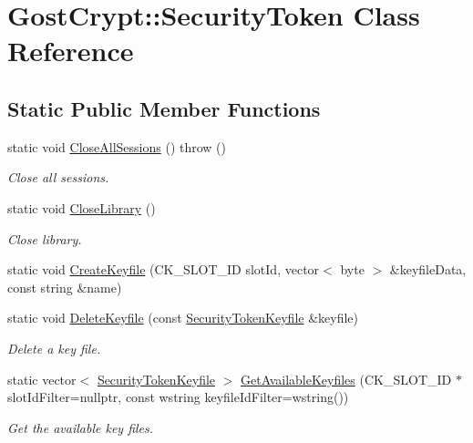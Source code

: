 \hypertarget{class_gost_crypt_1_1_security_token}{}\section{Gost\+Crypt\+:\+:Security\+Token Class Reference}
\label{class_gost_crypt_1_1_security_token}
\subsection*{Static Public Member Functions}
\begin{DoxyCompactItemize}
\item 
static void \hyperlink{class_gost_crypt_1_1_security_token_af12b0d8a2113b5bf9fc542089c22251e}{Close\+All\+Sessions} ()  throw ()
\begin{DoxyCompactList}\small\item\em Close all sessions. \end{DoxyCompactList}\item 
static void \hyperlink{class_gost_crypt_1_1_security_token_a70bb91f6128eef7fff77cf8cd32b456d}{Close\+Library} ()
\begin{DoxyCompactList}\small\item\em Close library. \end{DoxyCompactList}\item 
static void \hyperlink{class_gost_crypt_1_1_security_token_a72731ca68789319a814ecb16194bfb2c}{Create\+Keyfile} (C\+K\+\_\+\+S\+L\+O\+T\+\_\+\+ID slot\+Id, vector$<$ byte $>$ \&keyfile\+Data, const string \&name)
\item 
static void \hyperlink{class_gost_crypt_1_1_security_token_a3cd1116119da022125c2d94a55a74a53}{Delete\+Keyfile} (const \hyperlink{struct_gost_crypt_1_1_security_token_keyfile}{Security\+Token\+Keyfile} \&keyfile)
\begin{DoxyCompactList}\small\item\em Delete a key file. \end{DoxyCompactList}\item 
static vector$<$ \hyperlink{struct_gost_crypt_1_1_security_token_keyfile}{Security\+Token\+Keyfile} $>$ \hyperlink{class_gost_crypt_1_1_security_token_af193cf5d9f44f9639a44b6b74bec9758}{Get\+Available\+Keyfiles} (C\+K\+\_\+\+S\+L\+O\+T\+\_\+\+ID $\ast$slot\+Id\+Filter=nullptr, const wstring keyfile\+Id\+Filter=wstring())
\begin{DoxyCompactList}\small\item\em Get the available key files. \end{DoxyCompactList}\item 

\end{DoxyCompactItemize}
